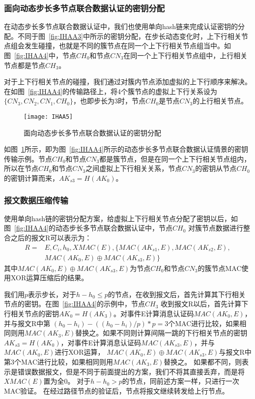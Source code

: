 \subsubsection{面向动态步长多节点联合数据认证的密钥分配}
在动态步长多节点联合数据认证中，我们也使用单向hash链来完成认证密钥的分配。不同于图~\ref{fig:IHAA3}中所示的密钥分配，在步长动态变化时，上下行相关节点组会发生碰撞，也就是不同的簇节点在同一个上下行相关节点组当中。如图~\ref{fig:IHAA4}中，节点$CH_0$和节点$CN_3$在同一个上下行相关节点组中，上行相关节点都是节点$CH_3$。

对于上下行相关节点的碰撞，我们通过对簇内节点添加虚拟的上下行顺序来解决。在如图~\ref{fig:IHAA4}的传输路径上，将4个簇节点的虚拟上下行关系设为$\{CN_3,CN_2,CN_1,CH_0\}$，也即步长为3时，节点$CH_0$是节点$CN_3$的上行相关节点。

\begin{figure}[htbp]
  \centering
  \texttt{[image: IHAA5]}
  \caption{面向动态步长多节点联合数据认证的密钥分配}
  \label{fig:IHAA5}
\end{figure}

如图~\ref{fig:IHAA5}所示，即为图~\ref{fig:IHAA4}所示的动态步长多节点联合数据认证情景的密钥传输示例。节点$CH_0$和节点$CN_3$都是簇节点，但是在同一个上下行相关节点组内，所以在节点$CH_0$和节点$CN_3$之间虚拟上下行相关关系，节点$CN_3$的密钥从节点$CH_0$的密钥计算而来，$AK_{s3}=H(AK_0)$。
\subsubsection{报文数据压缩传输}
使用单向hash链的密钥分配方案，给虚拟上下行相关节点分配了密钥以后，如图~\ref{fig:IHAA4}的动态步长多节点联合数据认证中，节点$CH_0$ 对簇节点数据进行整合之后的报文R可以表示为：
\begin{equation}\label{report3}
\begin{split}
  R=
  & E,C_i,h_0,XMAC(E),\{MAC(AK_{s1},E),MAC(AK_{s2},E),\\
  & MAC(AK_0,E)\oplus MAC(AK_{s3},E)\}
\end{split}
\end{equation}
其中$MAC(AK_0,E)\oplus MAC(AK_{s3},E)$为节点$CH_0$和节点$CN_3$的簇节点MAC使用XOR运算压缩后的结果。

我们用$p$表示步长，对于$h-h_0\leq p$的节点，在收到报文后，首先计算其下行相关节点的密钥。在图~\ref{fig:IHAA4}的示例中，节点$CH_3$ 收到报文R以后，首先计算下行相关节点的密钥$AK_0=H(AK_3)$。对事件E计算消息认证码$MAC(AK_0,E)$，并与报文R中第
$(h_0 - h_i)-((h_0 - h_i)/p)\ast p=3$个MAC进行比较，如果相同则用$MAC(AK_3,E)$替换之。如果不同则计算间隔一跳的下行相关节点的密钥$AK_{s3}=H(AK_0)$，对事件E计算消息认证码$MAC(AK_{s3},E)$，并与$MAC(AK_0,E)$进行XOR运算，
$MAC(AK_0,E)\oplus MAC(AK_{s3},E)$与报文R中第3个MAC进行比较，如果相同则用$MAC(AK_3,E)$替换之。
如果都不同，则表示是错误数据报文，但是不同于前面提出的方案，我们不将其直接丢弃，而是将$XMAC(E)$置为全0。
对于$h-h_0> p$的节点，同前述方案一样，只进行一次MAC验证。
在经过路径节点的验证后，节点将报文继续转发给上行节点。

